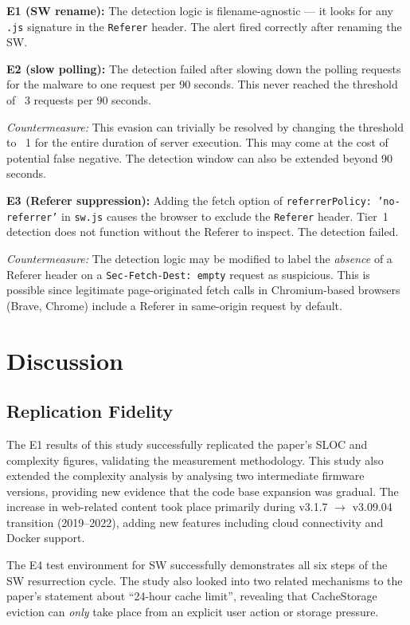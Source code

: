 \documentclass[conference]{IEEEtran}
\begin{document}
\textbf{E1 (SW rename):} The detection logic is filename-agnostic --- it looks for any \texttt{.js} signature in the \texttt{Referer} header. The alert fired correctly after renaming the SW.

\textbf{E2 (slow polling):} The detection failed after slowing down the polling requests for the malware to one request per 90 seconds. This never reached the threshold of ~3 requests per 90 seconds.

\emph{Countermeasure:} This evasion can trivially be resolved by changing the threshold to ~1 for the entire duration of server execution. This may come at the cost of potential false negative. The detection window can also be extended beyond 90 seconds.

\textbf{E3 (Referer suppression):} Adding the fetch option of
\texttt{referrerPolicy:~'no-referrer'} in \texttt{sw.js} causes the browser to exclude the \texttt{Referer} header. Tier~1 detection does not function without the Referer to inspect. The detection failed.

\emph{Countermeasure:} The detection logic may be modified to label the \emph{absence} of a Referer header on a \texttt{Sec-Fetch-Dest: empty} request as suspicious. This is possible since legitimate page-originated fetch calls in Chromium-based browsers (Brave, Chrome) include a Referer in same-origin request by default.

\section{Discussion}
\label{sec:discussion}

\subsection{Replication Fidelity}

The E1 results of this study successfully replicated the paper's SLOC and complexity figures, validating the measurement methodology. This study also extended the complexity analysis by analysing two intermediate firmware versions, providing new evidence that the code base expansion was gradual. The increase in web-related content took place primarily during v3.1.7 $\to$ v3.09.04 transition (2019--2022), adding new features including cloud connectivity and Docker support.

The E4 test environment for SW successfully demonstrates all six steps of the SW resurrection cycle. The study also looked into two related mechanisms to the paper's statement about ``24-hour cache limit'', revealing that CacheStorage eviction can \emph{only} take place from an explicit user action or storage pressure.
\end{document}

